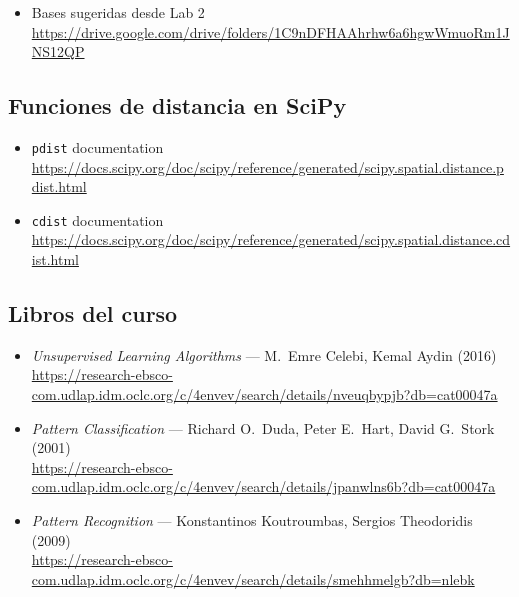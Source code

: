 \documentclass{article}
\begin{document}
\begin{itemize}
  \item Bases sugeridas desde Lab 2\\
  \url{https://drive.google.com/drive/folders/1C9nDFHAAhrhw6a6hgwWmuoRm1JNS12QP}
\end{itemize}

\subsection{Funciones de distancia en SciPy}

\begin{itemize}
  \item \texttt{pdist} documentation\\
  \url{https://docs.scipy.org/doc/scipy/reference/generated/scipy.spatial.distance.pdist.html}

  \item \texttt{cdist} documentation\\
  \url{https://docs.scipy.org/doc/scipy/reference/generated/scipy.spatial.distance.cdist.html}
\end{itemize}

\subsection{Libros del curso}

\begin{itemize}
  \item \textit{Unsupervised Learning Algorithms} --- M.~Emre Celebi, Kemal Aydin (2016)\\
  \url{https://research-ebsco-com.udlap.idm.oclc.org/c/4envev/search/details/nveuqbypjb?db=cat00047a}

  \item \textit{Pattern Classification} --- Richard O.~Duda, Peter E.~Hart, David G.~Stork (2001)\\
  \url{https://research-ebsco-com.udlap.idm.oclc.org/c/4envev/search/details/jpanwlns6b?db=cat00047a}

  \item \textit{Pattern Recognition} --- Konstantinos Koutroumbas, Sergios Theodoridis (2009)\\
  \url{https://research-ebsco-com.udlap.idm.oclc.org/c/4envev/search/details/smehhmelgb?db=nlebk}
\end{itemize}
\end{document}

